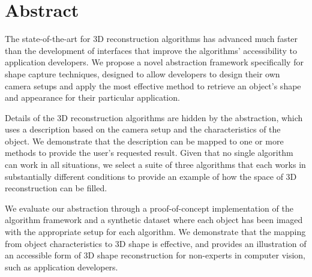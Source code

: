 
\chapter{Abstract}

The state-of-the-art for 3D reconstruction algorithms has advanced much faster than the development of interfaces that improve the algorithms' accessibility to application developers. We propose a novel abstraction framework specifically for shape capture techniques, designed to allow developers to design their own camera setups and apply the most effective method to retrieve an object's shape and appearance for their particular application.

Details of the 3D reconstruction algorithms are hidden by the abstraction, which uses a description based on the camera setup and the characteristics of the object. We demonstrate that the description can be mapped to one or more methods to provide the user's requested result. Given that no single algorithm can work in all situations, we select a suite of three algorithms that each works in substantially different conditions to provide an example of how the space of 3D reconstruction can be filled.

We evaluate our abstraction through a proof-of-concept implementation of the algorithm framework and a synthetic dataset where each object has been imaged with the appropriate setup for each algorithm. We demonstrate that the mapping from object characteristics to 3D shape is effective, and provides an illustration of an accessible form of 3D shape reconstruction for non-experts in computer vision, such as application developers.

